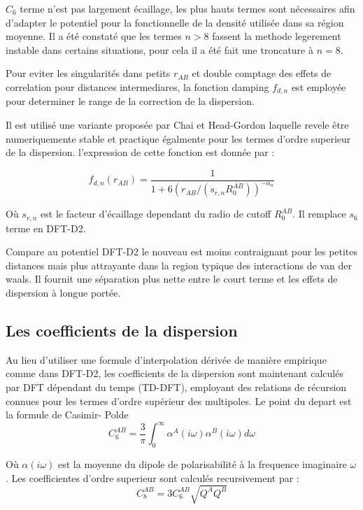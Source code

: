 	$C_{6}$ terme n'est pas largement écaillage, les plus hauts termes sont nécessaires afin d'adapter le potentiel pour la fonctionnelle de la densité utilisée dans sa région moyenne. Il a été constaté que les termes $n>8$ fassent la methode legerement instable dans certains situations, pour cela il a été fait une troncature à $n=8$.
	\bigskip
	
	Pour eviter les singularités dans petits $r_{AB}$ et double comptage des effets de correlation pour distances intermediares, la fonction damping $f_{d,n}$ est employée pour determiner le range de la correction de la dispersion.
	\bigskip
	
	Il est utilisé une variante proposée par Chai et Head-Gordon\cite{chai2008long} laquelle revele être numeriquemente stable et practique égalmente pour les termes d'ordre superieur de la dispersion. l'expression de cette fonction est donnée par :
	
	\begin{equation}
	f_{d,n} (r_{AB}) = \frac{1}{1+ 6(r_{AB}/(s_{r,n}R_{0}^{AB}))^{-\alpha_{n}}}
	\end{equation}
	\bigskip
	
	Où $s_{r,n}$ est le facteur d'écaillage dependant du radio de cutoff $R_{0}^{AB}$. Il remplace $s_{6}$ terme en DFT-D2. 
	\bigskip
	
	Compare au potentiel DFT-D2 le nouveau est moins contraignant pour les petites distances
	mais plus attrayante dans la region typique des interactions de van der waals. Il fournit une séparation plus nette entre le court terme et les effets de dispersion à longue portée.
	
	\subsection{Les coefficients de la dispersion}
	
	
	Au lieu d'utiliser une formule d'interpolation dérivée de manière empirique comme dans DFT-D2, les coefficients de la dispersion sont maintenant calculés par DFT dépendant du temps (TD-DFT), employant des relations de récursion connues pour les termes d'ordre supérieur des multipoles. Le point du depart est la formule de Casimir- Polde\cite{kaplan2006intermolecular} 
	\bigskip
	\begin{equation}
	C_{6}^{AB} = \frac{3}{\pi}\int_{0}^{\infty} \alpha^{A} (i\omega) \alpha^{B} (i\omega) d\omega
	\end{equation}
	\bigskip
	
	Où $\alpha(i\omega)$ est la moyenne du dipole de polarisabilité à la frequence imaginaire $\omega$. Les coefficientes d'ordre superieur sont calculés recursivement par :
	\bigskip
	\begin{equation}
	C_{8}^{AB} = 3C_{6}^{AB} \sqrt{Q^{A}Q^{B}}
	\end{equation}
	
